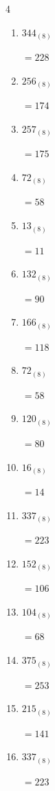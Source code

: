 \begin{multicols}{4}
\begin{enumerate}
        $=47$

  \item $344_{(8)}$

        $=228$

  \item $256_{(8)}$

        $=174$

  \item $257_{(8)}$

        $=175$

  \item $72_{(8)}$

        $=58$

  \item $13_{(8)}$

        $=11$

  \item $132_{(8)}$

        $=90$

  \item $166_{(8)}$

        $=118$

  \item $72_{(8)}$

        $=58$

  \item $120_{(8)}$

        $=80$

  \item $16_{(8)}$

        $=14$

  \item $337_{(8)}$

        $=223$

  \item $152_{(8)}$

        $=106$

  \item $104_{(8)}$

        $=68$

\columnbreak %

  \item $375_{(8)}$

        $=253$

  \item $215_{(8)}$

        $=141$

  \item $337_{(8)}$

        $=223$


\end{enumerate}
\end{multicols}
